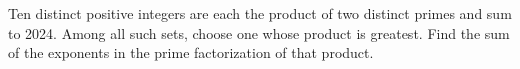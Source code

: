 Ten distinct positive integers are each the product of two distinct primes and sum to 2024. Among all such sets, choose one whose product is greatest. Find the sum of the exponents in the prime factorization of that product.
